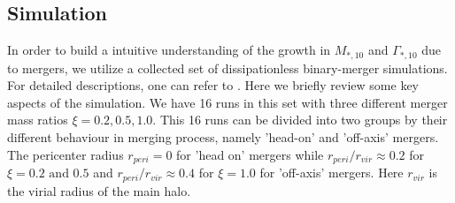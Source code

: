 \documentclass[fleqn,usenatbib]{mnras}
\begin{document}
\subsection{Simulation}
In order to build a intuitive understanding of the growth in $M_{*,10}$ and $\Gamma_{*,10}$ due to mergers, we utilize a collected set of dissipationless binary-merger simulations. For detailed descriptions, one can refer to \cite{sonnenfeld2014}. Here we briefly review some key aspects of the simulation. We have 16 runs in this set with three different merger mass ratios $\xi = 0.2, 0.5, 1.0 $. This 16 runs can be divided into two groups by their different behaviour in merging process, namely 'head-on' and 'off-axis' mergers. The pericenter radius $r_{peri} = 0$ for 'head on' mergers while $r_{peri} /r_{vir} \approx 0.2 $ for $\xi = 0.2 \text{ and } 0.5$ and $r_{peri} /r_{vir} \approx 0.4 $ for $\xi = 1.0$ for 'off-axis' mergers. Here $r_{vir}$ is the virial radius of the main halo. 
\end{document}

